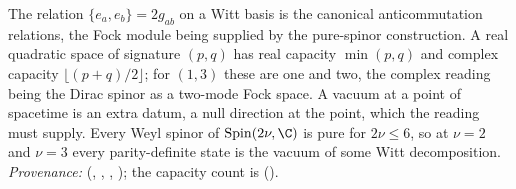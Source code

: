 The relation $\{e_a, e_b\} = 2g_{ab}$ on a Witt basis is the canonical anticommutation relations, the Fock module being supplied by the pure-spinor construction. A real quadratic space of signature $(p,q)$ has real capacity $\min(p,q)$ and complex capacity $\lfloor (p+q)/2 \rfloor$; for $(1,3)$ these are one and two, the complex reading being the Dirac spinor as a two-mode Fock space. A vacuum at a point of spacetime is an extra datum, a null direction at the point, which the reading must supply. Every Weyl spinor of $\mathrm{Spin}(2\nu, \C)$ is pure for $2\nu \leq 6$, so at $\nu = 2$ and $\nu = 3$ every parity-definite state is the vacuum of some Witt decomposition. \emph{Provenance:} \cite[Props.~3.1, 3.2, 4.1(3), Fact~2.10]{ButlerT16} (, , , ); the capacity count is \cite[Thm.~4.3]{ButlerT3} ().
